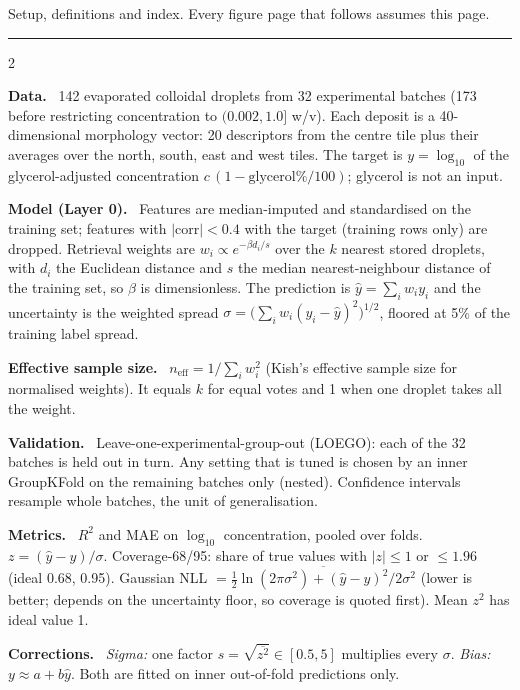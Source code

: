\documentclass[10pt,a4paper]{article}
\newcommand{\neff}{n_{\mathrm{eff}}}
\newcommand{\sect}[1]{\par\smallskip\noindent\textbf{\color{black!85}#1}\ }
\begin{document}
\sansmath

\par\vspace{0.5mm}
{\scriptsize\color{gray}Setup, definitions and index. Every figure page that follows assumes this page.}\par\vspace{0.5mm}\hrule\vspace{1.5mm}
\fontsize{8.8}{10.6}\selectfont
\begin{multicols}{2}
\sect{Data.} 142 evaporated colloidal droplets from 32 experimental batches (173 before restricting concentration to $(0.002,1.0]$ w/v). Each deposit is a 40-dimensional morphology vector: 20 descriptors from the centre tile plus their averages over the north, south, east and west tiles. The target is $y=\log_{10}$ of the glycerol-adjusted concentration $c\,(1-\text{glycerol}\%/100)$; glycerol is not an input.
\sect{Model (Layer 0).} Features are median-imputed and standardised on the training set; features with $|\mathrm{corr}|<0.4$ with the target (training rows only) are dropped. Retrieval weights are $w_i\propto e^{-\beta d_i/s}$ over the $k$ nearest stored droplets, with $d_i$ the Euclidean distance and $s$ the median nearest-neighbour distance of the training set, so $\beta$ is dimensionless. The prediction is $\hat y=\sum_i w_iy_i$ and the uncertainty is the weighted spread $\sigma=\bigl(\sum_i w_i(y_i-\hat y)^2\bigr)^{1/2}$, floored at 5\% of the training label spread.
\sect{Effective sample size.} $\neff=1/\sum_i w_i^2$ (Kish's effective sample size for normalised weights). It equals $k$ for equal votes and 1 when one droplet takes all the weight.
\sect{Validation.} Leave-one-experimental-group-out (LOEGO): each of the 32 batches is held out in turn. Any setting that is tuned is chosen by an inner GroupKFold on the remaining batches only (nested). Confidence intervals resample whole batches, the unit of generalisation.
\sect{Metrics.} $R^2$ and MAE on $\log_{10}$ concentration, pooled over folds. $z=(\hat y-y)/\sigma$. Coverage-68/95: share of true values with $|z|\le1$ or $\le1.96$ (ideal 0.68, 0.95). Gaussian NLL $=\overline{\tfrac12\ln(2\pi\sigma^2)+(\hat y-y)^2/2\sigma^2}$ (lower is better; depends on the uncertainty floor, so coverage is quoted first). Mean $z^2$ has ideal value 1.
\sect{Corrections.} \emph{Sigma:} one factor $s=\sqrt{\overline{z^2}}\in[0.5,5]$ multiplies every $\sigma$. \emph{Bias:} $y\approx a+b\hat y$. Both are fitted on inner out-of-fold predictions only.

\end{multicols}
\end{document}
